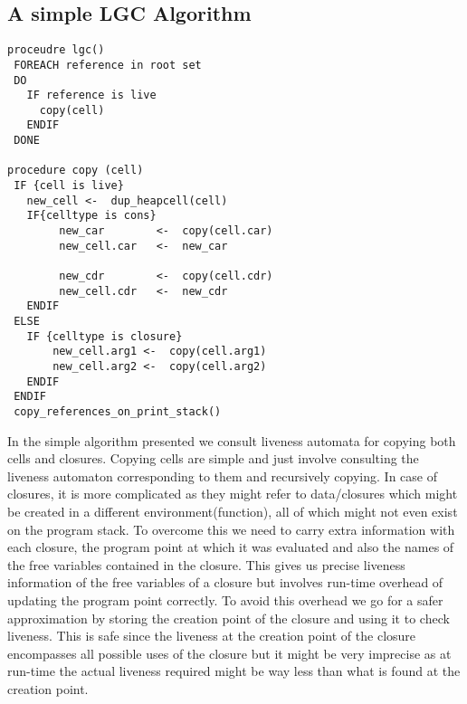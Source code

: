 \documentclass[9pt]{sigplanconf}
\newcommand{\cred}[1]{{\color{red}{#1}}}
\begin{document}
\subsection{A simple LGC Algorithm}
\cred{Introduce terminology}
\begin{verbatim}
proceudre lgc()
 FOREACH reference in root set
 DO
   IF reference is live
     copy(cell)
   ENDIF
 DONE

procedure copy (cell)
 IF {cell is live}
   new_cell <-  dup_heapcell(cell)
   IF{celltype is cons}
        new_car        <-  copy(cell.car)
        new_cell.car   <-  new_car
      
        new_cdr        <-  copy(cell.cdr)
        new_cell.cdr   <-  new_cdr
   ENDIF
 ELSE
   IF {celltype is closure}
       new_cell.arg1 <-  copy(cell.arg1)
       new_cell.arg2 <-  copy(cell.arg2)
   ENDIF
 ENDIF
 copy_references_on_print_stack()
\end{verbatim}
In  the simple algorithm  presented we  consult liveness  automata for
copying both \CONS cells and closures.  Copying \CONS cells are simple
and just  involve consulting  the liveness automaton  corresponding to
them  and  recursively  copying.  In  case of  closures,  it  is  more
complicated  as  they might  refer  to  data/closures  which might  be
created in  a different environment(function), all of  which might not
even exist  on the program  stack. To overcome  this we need  to carry
extra information with each closure, the program point at which it was
evaluated and  also the names of  the free variables  contained in the
closure.  This  gives us  precise  liveness  information  of the  free
variables of a closure but  involves run-time overhead of updating the
program  point correctly. To  avoid this  overhead we  go for  a safer
approximation by storing  the creation point of the  closure and using
it to check liveness.  This is safe since the liveness at the creation
point of the closure encompasses  all possible uses of the closure but
it might be very imprecise as at run-time the actual liveness required
might be way less than what is found at the creation point.
\end{document}
